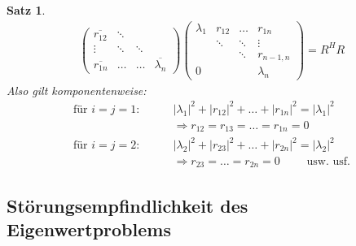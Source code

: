 \documentclass[%
a4paper,
11pt,		%
]
{scrartcl}
\theoremstyle{plain}
\theoremstyle{plain}
\newtheorem{mysatz}[mydef]{Satz}
\theoremstyle{plain}
\theoremstyle{plain}
\begin{document}
\begin{mysatz}
\begin{align*}
\begin{pmatrix}
\overline{r_{12}}       & \ddots\\
\vdots                  & \ddots & \ddots\\
\overline{r_{1n}}       & \dots & \dots & \overline{\lambda_n}
\end{pmatrix}
\begin{pmatrix}
\lambda_1   & r_{12}    & \dots     & r_{1n}\\
            & \ddots    & \ddots    & \vdots\\
            &           & \ddots    & r_{n-1,n}\\
0           &           &           & \lambda_n
\end{pmatrix}
= R^H R
\end{align*}
Also gilt komponentenweise:
\begin{align*}
\text{für } i=j=1: \qquad & |\lambda_1|^2 + |r_{12}|^2 + \dots + |r_{1n}|^2 = |\lambda_1|^2\\
& \Rightarrow r_{12} = r_{13} = \dots = r_{1n} = 0\\
\text{für } i=j=2: \qquad & |\lambda_2|^2 + |r_{23}|^2 + \dots + |r_{2n}|^2 = |\lambda_2|^2\\
& \Rightarrow r_{23} = \dots = r_{2n} = 0 \qquad \text{ usw. usf.}
\end{align*}
\end{mysatz}

\subsection{Störungsempfindlichkeit des Eigenwertproblems}
\label{sub:Störungsempfindlichkeit des Eigenwertproblems}
\end{document}
